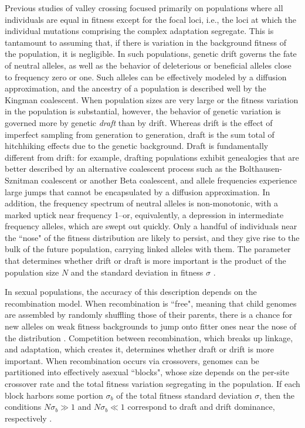 \documentclass[rmp]{revtex4}
\begin{document}
Previous studies of valley crossing focused primarily on populations where all individuals are equal in fitness except for the focal loci, i.e., the loci at which the individual mutations comprising the complex adaptation segregate.
This is tantamount to assuming that, if there is variation in the background fitness of the population, it is negligible.
In such populations, genetic drift governs the fate of neutral alleles, as well as the behavior of deleterious or beneficial alleles close to frequency zero or one.
Such alleles can be effectively modeled by a diffusion approximation, and the ancestry of a population is described well by the Kingman coalescent.
When population sizes are very large or the fitness variation in the population is substantial, however, the behavior of genetic variation is governed more by genetic \emph{draft} than by drift.
Whereas drift is the effect of imperfect sampling from generation to generation, draft is the sum total of hitchhiking effects due to the genetic background.
Draft is fundamentally different from drift: for example, drafting populations exhibit genealogies that are better described by an alternative coalescent process such as the Bolthausen-Sznitman coalescent or another Beta coalescent, and allele frequencies experience large jumps that cannot be encapsulated by a diffusion approximation.
In addition, the frequency spectrum of neutral alleles is non-monotonic, with a marked uptick near frequency 1--or, equivalently, a depression in intermediate frequency alleles, which are swept out quickly.
Only a handful of individuals near the ``nose" of the fitness distribution are likely to persist, and they give rise to the bulk of the future population, carrying linked alleles with them.
The parameter that determines whether drift or draft is more important is the product of the population size $N$ and the standard deviation in fitness $\sigma$ \citep{neher_hallatschek_2013}.

In sexual populations, the accuracy of this description depends on the recombination model.
When recombination is ``free", meaning that child genomes are assembled by randomly shuffling those of their parents, there is a chance for new alleles on weak fitness backgrounds to jump onto fitter ones near the nose of the distribution \citep{neher_shraiman_2011}.
Competition between recombination, which breaks up linkage, and adaptation, which creates it, determines whether draft or drift is more important.
When recombination occurs via crossovers, genomes can be partitioned into effectively asexual ``blocks", whose size depends on the per-site crossover rate and the total fitness variation segregating in the population.
If each block harbors some portion $\sigma_b$ of the total fitness standard deviation $\sigma$, then the conditions $N\sigma_b \gg 1$ and $N\sigma_b \ll 1$ correspond to draft and drift dominance, respectively \citep{neher_kessinger_2013}.
\end{document}
